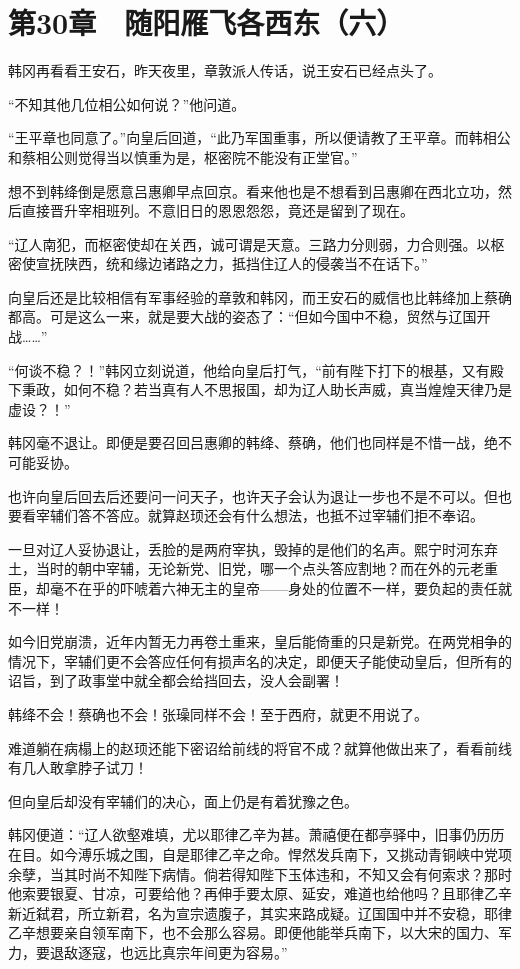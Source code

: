 \section{第30章　随阳雁飞各西东（六）}

韩冈再看看王安石，昨天夜里，章敦派人传话，说王安石已经点头了。 

“不知其他几位相公如何说？”他问道。 

“王平章也同意了。”向皇后回道，“此乃军国重事，所以便请教了王平章。而韩相公和蔡相公则觉得当以慎重为是，枢密院不能没有正堂官。” 

想不到韩绛倒是愿意吕惠卿早点回京。看来他也是不想看到吕惠卿在西北立功，然后直接晋升宰相班列。不意旧日的恩恩怨怨，竟还是留到了现在。 

“辽人南犯，而枢密使却在关西，诚可谓是天意。三路力分则弱，力合则强。以枢密使宣抚陕西，统和缘边诸路之力，抵挡住辽人的侵袭当不在话下。” 

向皇后还是比较相信有军事经验的章敦和韩冈，而王安石的威信也比韩绛加上蔡确都高。可是这么一来，就是要大战的姿态了：“但如今国中不稳，贸然与辽国开战……” 

“何谈不稳？！”韩冈立刻说道，他给向皇后打气，“前有陛下打下的根基，又有殿下秉政，如何不稳？若当真有人不思报国，却为辽人助长声威，真当煌煌天律乃是虚设？！” 

韩冈毫不退让。即便是要召回吕惠卿的韩绛、蔡确，他们也同样是不惜一战，绝不可能妥协。 

也许向皇后回去后还要问一问天子，也许天子会认为退让一步也不是不可以。但也要看宰辅们答不答应。就算赵顼还会有什么想法，也抵不过宰辅们拒不奉诏。 

一旦对辽人妥协退让，丢脸的是两府宰执，毁掉的是他们的名声。熙宁时河东弃土，当时的朝中宰辅，无论新党、旧党，哪一个点头答应割地？而在外的元老重臣，却毫不在乎的吓唬着六神无主的皇帝——身处的位置不一样，要负起的责任就不一样！ 

如今旧党崩溃，近年内暂无力再卷土重来，皇后能倚重的只是新党。在两党相争的情况下，宰辅们更不会答应任何有损声名的决定，即便天子能使动皇后，但所有的诏旨，到了政事堂中就全都会给挡回去，没人会副署！ 

韩绛不会！蔡确也不会！张璪同样不会！至于西府，就更不用说了。 

难道躺在病榻上的赵顼还能下密诏给前线的将官不成？就算他做出来了，看看前线有几人敢拿脖子试刀！ 

但向皇后却没有宰辅们的决心，面上仍是有着犹豫之色。 

韩冈便道：“辽人欲壑难填，尤以耶律乙辛为甚。萧禧便在都亭驿中，旧事仍历历在目。如今溥乐城之围，自是耶律乙辛之命。悍然发兵南下，又挑动青铜峡中党项余孽，当其时尚不知陛下病情。倘若得知陛下玉体违和，不知又会有何索求？那时他索要银夏、甘凉，可要给他？再伸手要太原、延安，难道也给他吗？且耶律乙辛新近弑君，所立新君，名为宣宗遗腹子，其实来路成疑。辽国国中并不安稳，耶律乙辛想要亲自领军南下，也不会那么容易。即便他能举兵南下，以大宋的国力、军力，要退敌逐寇，也远比真宗年间更为容易。” 

